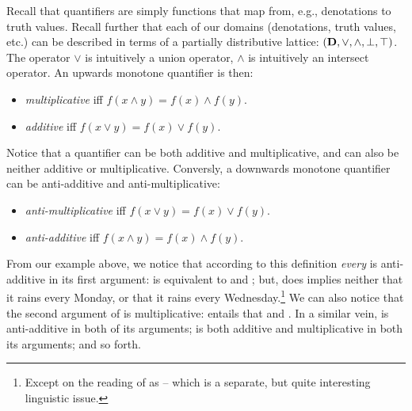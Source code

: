 Recall that quantifiers are simply functions that map from, e.g., denotations to truth values.
Recall further that each of our domains (denotations, truth values, etc.) can be described
  in terms of a partially distributive lattice: $(\mathbf{D}, \lor, \land, \bot, \top)$.
The operator $\lor$ is intuitively a union operator, $\land$ is intuitively an intersect
  operator.
An upwards monotone quantifier is then:

\begin{itemize}
  \item \textit{multiplicative} iff $f(x \land y) = f(x) \land f(y)$.
  \item \textit{additive}       iff $f(x \lor y) = f(x) \lor f(y)$.
\end{itemize}

Notice that a quantifier can be both additive and multiplicative, and can also be
  neither additive or multiplicative.
Conversly, a downwards monotone quantifier can be anti-additive and anti-multiplicative:

\begin{itemize}
  \item \textit{anti-multiplicative} iff $f(x \lor y) = f(x) \lor f(y)$.
  \item \textit{anti-additive}       iff $f(x \land y) = f(x) \land f(y)$.
\end{itemize}

From our example above, we notice that according to this definition \textit{every} is
  anti-additive in its first argument:
   is equivalent to 
    and ;
  but,  does implies neither that it rains every Monday,
    or that it rains every Wednesday.\footnote{
      Except on the reading of  as  -- which is
        a separate, but quite interesting linguistic issue.
    }
We can also notice that the second argument of  is multiplicative:
   entails that  and
  .
In a similar vein,  is anti-additive in both of its arguments;
   is both additive and multiplicative in both its arguments; and so forth.


